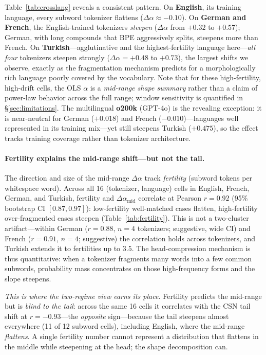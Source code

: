 \documentclass{article}
\begin{document}
Table~\ref{tab:crosslang} reveals a consistent pattern. On \textbf{English}, its training
language, every subword tokenizer flattens ($\Delta\alpha \approx -0.10$). On
\textbf{German and French}, the English-trained tokenizers \emph{steepen}
($\Delta\alpha$ from $+0.32$ to $+0.57$); German, with long compounds that BPE
aggressively splits, steepens more than French. On \textbf{Turkish}---agglutinative and
the highest-fertility language here---\emph{all four} tokenizers steepen strongly
($\Delta\alpha = +0.48$ to $+0.73$), the largest shifts we observe, exactly as the
fragmentation mechanism predicts for a morphologically rich language poorly covered by
the vocabulary. Note that for these high-fertility, high-drift cells, the OLS $\alpha$
is a \emph{mid-range shape summary} rather than a claim of power-law behavior across the
full range; window sensitivity is quantified in \S\ref{sec:limitations}. The multilingual \textbf{o200k} (GPT-4o) is the revealing exception: it
is near-neutral for German ($+0.018$) and French ($-0.010$)---languages well represented
in its training mix---yet still steepens Turkish ($+0.475$), so the effect tracks
training coverage rather than tokenizer architecture.

\paragraph{Fertility explains the mid-range shift---but not the tail.}
The direction and size of the mid-range $\Delta\alpha$ track \emph{fertility} (subword
tokens per whitespace word). Across all 16 (tokenizer, language) cells in English,
French, German, and Turkish, fertility and $\Delta\alpha_{\text{mid}}$ correlate at
Pearson $r = 0.92$ (95\% bootstrap CI $[0.87, 0.97]$): low-fertility well-matched cases
flatten, high-fertility over-fragmented cases steepen (Table~\ref{tab:fertility}). This
is not a two-cluster artifact---within German ($r = 0.88$, $n{=}4$ tokenizers; suggestive,
wide CI) and French ($r = 0.91$, $n{=}4$; suggestive) the correlation holds across
tokenizers, and Turkish extends it to fertilities up to $3.5$. The
head-compression mechanism is thus quantitative: when a tokenizer fragments many words
into a few common subwords, probability mass concentrates on those high-frequency forms
and the slope steepens.

\emph{This is where the two-regime view earns its place.} Fertility predicts the
mid-range but is \emph{blind to the tail}: across the same 16 cells it correlates with
the CSN tail shift at $r = -0.93$---the \emph{opposite} sign---because the tail steepens
almost everywhere (11 of 12 subword cells), including English, where the mid-range
\emph{flattens}. A single fertility number cannot represent a distribution that flattens
in the middle while steepening at the head; the shape decomposition can.
\end{document}
